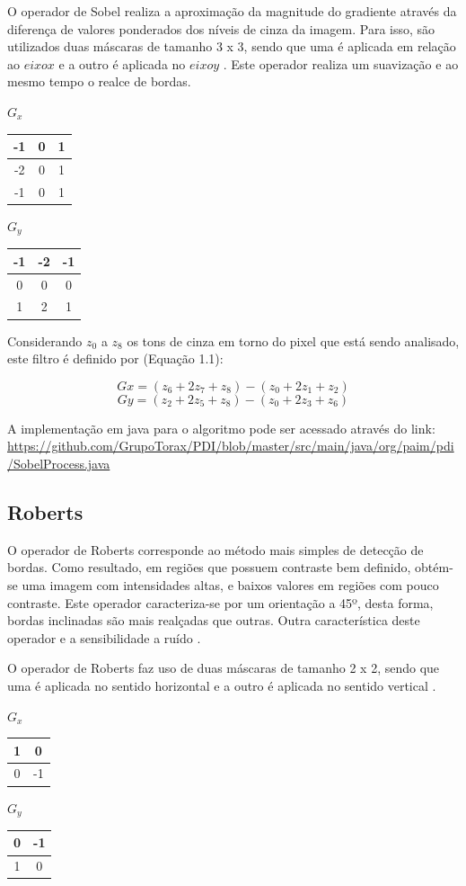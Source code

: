 \documentclass[
	12pt,				%
	oneside,			%
	a4paper,			%
	english,			%
	french,				%
	spanish,			%
	brazil,				%
	]{abntex2}
\begin{document}
O operador de Sobel realiza a aproximação da magnitude do gradiente através da diferença de valores ponderados dos níveis de cinza da imagem. Para isso, são utilizados duas máscaras de tamanho 3 x 3, sendo que uma é aplicada em relação ao \(eixo x\) e a outro é aplicada no \(eixo y\) \cite{pedriniSchwartz:2008}. Este operador realiza um suavização e ao mesmo tempo o realce de bordas.

\(G_x\)
\begin{tabular}{|c|c|c|}
	\hline
    -1 & 0 & 1   \\ \hline
	-2 & 0 & 1   \\ \hline   
	-1 & 0 & 1   \\ \hline   
\end{tabular}
\(G_y\)
\begin{tabular}{|c|c|c|}
    \hline
    -1 & -2 & -1   \\ \hline
	 0 &  0 & 0   \\ \hline   
	 1 &  2 & 1   \\ \hline   
\end{tabular}

Considerando \(z_0\) a \(z_8\) os tons de cinza em torno do pixel que está sendo analisado, este filtro é definido por (Equação 1.1):

\[Gx = (z_6 + 2z_7 + z_8) - (z_0 + 2z_1 + z_2)\]
\[Gy = (z_2 + 2z_5 + z_8) - (z_0 + 2z_3 + z_6)\]

A implementação em java para o algoritmo pode ser acessado através do link:
\url{https://github.com/GrupoTorax/PDI/blob/master/src/main/java/org/paim/pdi/SobelProcess.java}

\subsection{Roberts}
O operador de Roberts corresponde ao método mais simples de detecção de bordas. Como resultado, em regiões que possuem contraste bem definido, obtém-se uma imagem com intensidades altas, e baixos valores em regiões com pouco contraste. Este operador caracteriza-se por um orientação a 45º, desta forma, bordas inclinadas são mais realçadas que outras. Outra característica deste operador e a sensibilidade a ruído \cite{conciAzevedoLeta:2008}.

O operador de Roberts faz uso de duas máscaras de tamanho 2 x 2, sendo que uma é aplicada no sentido horizontal e a outro é aplicada no sentido vertical \cite{pedriniSchwartz:2008}.

\(G_x\)
\begin{tabular}{|c|c|}
	\hline
    1 &  0    \\ \hline
	0 & -1    \\ \hline   
\end{tabular}
\(G_y\)
\begin{tabular}{|c|c|}
    \hline
    0 & -1   \\ \hline
	1 &  0   \\ \hline   
\end{tabular}
\end{document}
